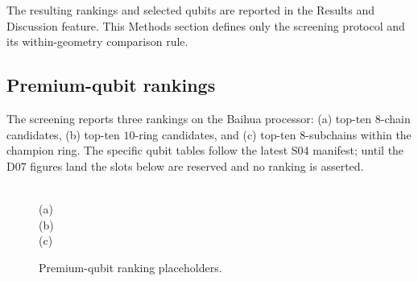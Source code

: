 The resulting rankings and selected qubits are reported in the Results and
Discussion feature. This Methods section defines only the screening
protocol and its within-geometry comparison rule.

\subsection{Premium-qubit rankings}
\label{sec:rankings}

The screening reports three rankings on the Baihua processor: (a) top-ten
$8$-chain candidates, (b) top-ten $10$-ring candidates, and (c) top-ten
$8$-subchains within the champion ring. The specific qubit tables follow
the latest S04 manifest; until the D07 figures land the slots below are
reserved and no ranking is asserted.

\begin{figure}[htbp]
\centering
{}\\(a)
\\(b)
\\(c)
\caption{Premium-qubit ranking placeholders. \label{fig:D07}}
\end{figure}
